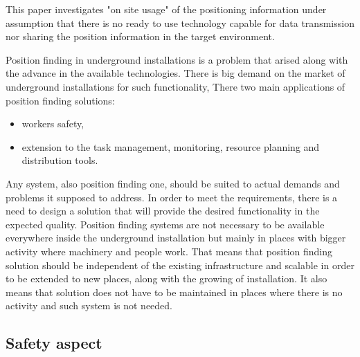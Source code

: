 \documentclass[../main.tex]{subfiles}
\begin{document}
This paper investigates "on site usage" of the positioning information under assumption that there is no ready to use technology capable for data transmission nor sharing the position information in the target environment.

Position finding in underground installations is a problem that arised along with the advance in the available technologies. There is big demand on the market of underground installations for such functionality, There two main applications of position finding solutions:
\begin{itemize}
	\item workers safety,
	\item extension to the task management, monitoring, resource planning and distribution tools.
\end{itemize}


Any system, also position finding one, should be suited to actual demands and problems it supposed to address. In order to meet the requirements, there is a need to design a solution that will provide the desired functionality in the expected quality. Position finding systems are not necessary to be available everywhere inside the underground installation but mainly in places with bigger activity where machinery and people work. That means that position finding solution should be independent of the existing infrastructure and scalable in order to be extended to new places, along with the growing of installation. It also means that solution does not have to be maintained in places where there is no activity and such system is not needed.


\subsection{Safety aspect} %
\label{sub:safety_aspect}
\end{document}
